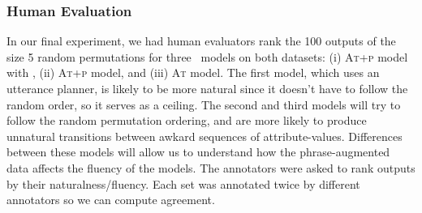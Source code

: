\subsubsection{Human Evaluation} In our final experiment, we had human evaluators
rank the 100 outputs of the size 5 random permutations for three \BART~models
on both datasets: (i) \textsc{At+p} model with \NUP,  (ii) \textsc{At+p}
model, and (iii) \textsc{At} model.  The first model, which uses an utterance
planner, is likely to be more natural since it doesn't have to follow the
random order, so it serves as a ceiling.  The second and third models will try
to follow the random permutation ordering, and are more likely to produce
unnatural transitions between awkard sequences of attribute-values.
Differences between these models will allow us to understand how the
phrase-augmented data affects the fluency of the models.  The annotators were
asked to rank outputs by their naturalness/fluency.  Each set was annotated
twice by different annotators so we can compute agreement. %



